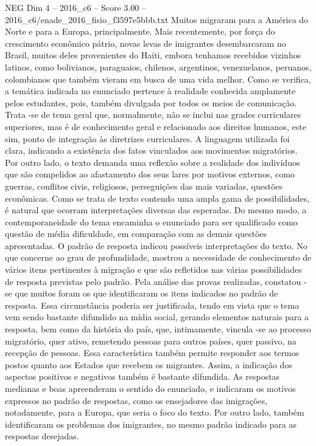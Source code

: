 \begin{textsample}{NEG Dim 4 – 2016\_c6 – Score 3.00 – 2016\_c6/enade\_2016\_fisio\_f3597e5bbb.txt}
Muitos migraram para a América do Norte e para a Europa, principalmente.
Mais recentemente, por força do crescimento econômico pátrio, novas levas de imigrantes desembarcaram no Brasil, muitos deles provenientes do Haiti, embora tenhamos recebidos vizinhos latinos, como bolivianos, paraguaios, chilenos, argentinos, venezuelanos, peruanos, colombianos que também vieram em busca de uma vida melhor.
Como se verifica, a temática indicada no enunciado pertence à realidade conhecida amplamente pelos estudantes, pois, também divulgada por todos os meios de comunicação.
Trata -se de tema geral que, normalmente, não se inclui nas grades curriculares superiores, mas é de conhecimento geral e relacionado aos direitos humanos, este sim, ponto de integração às diretrizes curriculares.
A linguagem utilizada foi clara, indicando a existência dos fatos vinculados aos movimentos migratórios.
Por outro lado, o texto demanda uma reflexão sobre a realidade dos indivíduos que são compelidos ao afastamento dos seus lares por motivos externos, como guerras, conflitos civis, religiosos, perseguições das mais variadas, questões econômicas.
Como se trata de texto contendo uma ampla gama de possibilidades, é natural que ocorram interpretações diversas das esperadas.
Do mesmo modo, a contemporaneidade do tema encaminha o enunciado para ser qualificado como questão de média dificuldade, em comparação com as demais questões apresentadas.
O padrão de resposta indicou possíveis interpretações do texto.
No que concerne ao grau de profundidade, mostrou a necessidade de conhecimento de vários itens pertinentes à migração e que são refletidos nas várias possibilidades de resposta previstas pelo padrão.
Pela análise das provas realizadas, constatou -se que muitos foram os que identificaram os itens indicados no padrão de resposta.
Essa circunstância poderia ser justificada, tendo em vista que o tema vem sendo bastante difundido na mídia social, gerando elementos naturais para a resposta, bem como da história do país, que, intimamente, vincula -se ao processo migratório, quer ativo, remetendo pessoas para outros países, quer passivo, na recepção de pessoas.
Essa característica também permite responder aos termos postos quanto aos Estados que recebem os migrantes.
Assim, a indicação dos aspectos positivos e negativos também é bastante difundida.
As respostas medianas e boas apreenderam o sentido do enunciado, e indicaram os motivos expressos no padrão de respostas, como os ensejadores das imigrações, notadamente, para a Europa, que seria o foco do texto.
Por outro lado, também identificaram os problemas dos imigrantes, no mesmo padrão indicado para as respostas desejadas.

\end{textsample}
